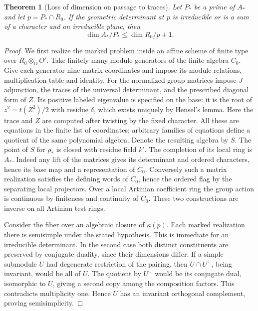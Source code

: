 \documentclass[a4paper,11pt]{article}
\newtheorem{theorem}[proposition]{Theorem}
\theoremstyle{definition}
\theoremstyle{remark}
\numberwithin{equation}{section}
\begin{document}
\begin{theorem}[Loss of dimension on passage to traces]\leavevmode
\label{thm:tracefiber420}
Let \(P_*\) be a prime of \(A_*\) and let \(p=P_*\cap R_0\).
If the geometric determinant at \(p\) is irreducible or is
a sum of a character and an irreducible plane, then
\[
                         \dim A_*/P_*\le \dim R_0/p+1.
\]
\end{theorem}
\begin{proof}
We first realize the marked problem inside an affine scheme of
finite type over \(R_0\otimes_O O'\). Take finitely many module
generators of the finite algebra \(C_0\). Give each generator
nine matrix coordinates and impose its module relations,
multiplication table and identity. For the normalized group
matrices impose \(J\)-adjunction, the traces of the universal
determinant, and the prescribed diagonal form of \(Z\).
Its positive labeled eigenvalue is specified on the base:
it is the root of \(z^2=t(Z^2)/2\) with residue \(\delta\),
which exists uniquely by Hensel's lemma. Here the trace and \(Z\)
are computed after twisting by the fixed character. All these
are equations in the finite list of coordinates; arbitrary
families of equations define a quotient of the same polynomial
algebra. Denote the resulting algebra by \(S\). The point of
\(S\) for \(\rho_*\) is closed with residue field \(k'\).
The completion of its local ring is \(A_*\). Indeed any lift
of the matrices gives its determinant and ordered characters,
hence its base map and a representation of \(C_0\). Conversely
such a matrix realization satisfies the defining words of
\(C_0\), hence the ordered flag by the separating local
projectors. Over a local Artinian coefficient ring the group
action is continuous by finiteness and continuity of \(C_0\).
These two constructions are inverse on all Artinian test rings.

Consider the fiber over an algebraic closure of \(\kappa(p)\).
Each marked realization there is semisimple under the stated
hypothesis. This is immediate for an irreducible determinant.
In the second case both distinct constituents are preserved by
conjugate duality, since their dimensions differ. If a simple
submodule \(U\) had degenerate restriction of the pairing,
then \(U\cap U^\perp\), being invariant, would be all of \(U\).
The quotient by \(U^\perp\) would be its conjugate dual,
isomorphic to \(U\), giving a second copy among the composition
factors. This contradicts multiplicity one. Hence \(U\) has
an invariant orthogonal complement, proving semisimplicity.


\end{proof}
\end{document}
